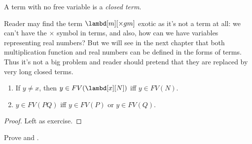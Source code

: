 \documentclass[../../../include/open-logic-section]{subfiles}
\begin{document}
\begin{defn}
  A term with no free variable is a \emph{closed term}.
\end{defn}

\begin{explain}
  Reader may find the term $\lambd[m][\times g m]$ exotic as it's not
  a term at all: we can't have the $\times$ symbol in terms, and also,
  how can we have variables representing real numbers? But we will see
  in the next chapter that both multiplication function and real
  numbers can be defined in the forms of terms. Thus it's not a big
  problem and reader should pretend that they are replaced by very
  long closed terms.
\end{explain}

\begin{lem}
  \begin{enumerate}
    \item {} If $y \neq x$, then $y \in FV(\lambd[x][N])$ iff $y \in
    FV(N)$.
    \item {} $y \in FV(PQ)$ iff $y \in FV(P)$ or
      $y \in FV(Q)$.
    \end{enumerate}
\end{lem}
\begin{proof}
  Left as exercise.
\end{proof}

\begin{prob}
  Prove  and .
\end{prob}
\end{document}
